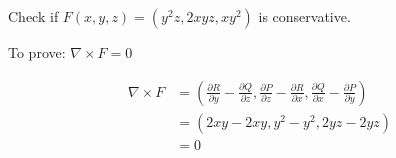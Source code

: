 \begin{exercise}
	Check if $F(x,y,z) = (y^2 z, 2xyz, xy^2)$ is conservative.
\end{exercise}

\begin{solution}
	To prove: $\nabla \times F = 0$

	$$
		\begin{aligned}
			\nabla \times F & = \left( \frac{\partial R}{\partial y} - \frac{\partial Q}{\partial z}, \frac{\partial P}{\partial z} - \frac{\partial R}{\partial x}, \frac{\partial Q}{\partial x} - \frac{\partial P}{\partial y} \right) \\
			                & = \left( 2xy - 2xy, y^2 - y^2, 2yz - 2yz \right)                                                                                                                                                             \\
			                & = 0
		\end{aligned}
	$$
\end{solution}

